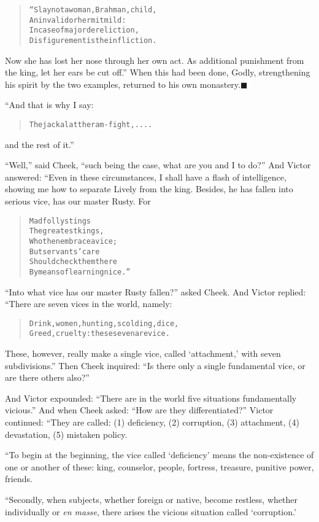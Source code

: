 \documentclass[article, twoside, 14pt]{memoir}
\newcommand{\qed}{\hfill \ensuremath{\blacksquare}}
\renewenvironment{verbatim}{%
\begin{quote}%
\vskip -10pt%
\begin{alltt}\normalfont\large}{\end{alltt}%
\end{quote}%
\vskip -10pt
} %
\begin{document}
\begin{verbatim}
“Slay not a woman, Brahman, child,
An invalid or hermit mild:
In case of major dereliction,
Disfigurement is the infliction.
\end{verbatim}
Now she has lost her nose through her own act. As additional
punishment from the king, let her ears be cut off.” When this had
been done, Godly, strengthening his spirit by the two examples,
returned to his own monastery.\hyperref[s7]{\qed}

“And that is why I say:

\begin{verbatim}
The jackal at the ram-fight, ....
\end{verbatim}
and the rest of it.”

``Well,'' said Cheek,
``such being the case, what are you and I to do?'' And Victor
answered: “Even in these circumstances, I shall have a flash of
intelligence, showing me how to separate Lively from the king.
Besides, he has fallen into serious vice, has our master Rusty.
For

\begin{verbatim}
Mad folly stings
The greatest kings,
    Who then embrace a vice;
But servants' care
Should check them there
    By means of learning nice.”
\end{verbatim}
``Into what vice has our master Rusty fallen?'' asked Cheek. And
Victor replied: “There are seven vices in the world, namely:

\begin{verbatim}
Drink, women, hunting, scolding, dice,
Greed, cruelty: these seven are vice.
\end{verbatim}
These, however, really make a single vice, called `attachment,'
with seven subdivisions.” Then Cheek inquired:
``Is there only a single fundamental vice, or are there others also?''

And Victor expounded:
``There are in the world five situations fundamentally vicious.''
And when Cheek asked: ``How are they differentiated?'' Victor
continued: “They are called: (1) deficiency, (2) corruption, (3)
attachment, (4) devastation, (5) mistaken policy.

“To begin at the beginning, the vice called `deficiency' means the
non-existence of one or another of these: king, counselor, people,
fortress, treasure, punitive power, friends.

“Secondly, when subjects, whether foreign or native, become
restless, whether individually or \emph{en masse}, there arises the
vicious situation called `corruption.'
\end{document}
